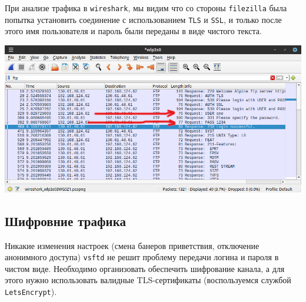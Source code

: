 При анализе трафика в \texttt{wireshark}, мы видим что со стороны \texttt{filezilla} была попытка установить соединение с использованием \texttt{TLS} и \texttt{SSL}, и только после этого имя пользователя и пароль были переданы в виде чистого текста.
\begin{center}
    \includegraphics[scale=0.55]{res/5.wireshark-ftp-plain.png}
\end{center}

\subsection*{Шифровние трафика}

Никакие изменения настроек (смена банеров приветствия, отключение анонимного доступа) \texttt{vsftd} не решит проблему передачи логина и пароля в чистом виде. Необходимо организовать обеспечить шифрование канала, а для этого нужно использовать валидные TLS-сертификаты (воспользуемся службой \texttt{LetsEncrypt}).


